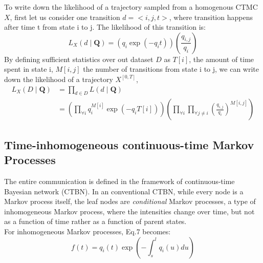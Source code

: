 \documentclass[]{article}
\begin{document}
To write down the likelihood of a trajectory sampled from a homogenous CTMC $ X $, first let us consider one transition $ d = <i,j,t> $, where transition happens after time t from state i to j. The likelihood of this transition is:
\begin{equation}
L_{X}(d \mid \textbf{Q})=\left(q_{i} \exp \left(-q_{i} t\right)\right)\left(\frac{q_{i,j}}{q_{i}}\right)
\end{equation}
By defining sufficient statistics over out dataset $ D $ as $ T[i] $, the amount of time spent in state i, $ M[i,j] $ the number of transitions from state i to j, we can write down the likelihood of a trajectory $  X^{\left[0,T\right] } $,
\begin{equation}
\begin{split}
L_{X}(D \mid \textbf{Q}) &=  \prod_{d \in D} L(d \mid \textbf{Q}) \\&=\left(\prod_{\forall i} q_{i}^{M[i]} \exp \left(-q_{i} T[i]\right)\right)\left(\prod_{\forall i} \prod_{\forall j \neq i} \left(\frac{q_{i,j}}{q_{i}}\right)^{M\left[i, j\right]}\right)
\end{split}
\end{equation}

\subsection{Time-inhomogeneous continuous-time Markov Processes}
The entire communication is defined in the framework of continuous-time Bayesian network (CTBN). In an conventional CTBN, while every node is a Markov process itself, the leaf nodes are \textit{conditional} Markov processes, a type of inhomogeneous Markov process, where the intensities change over time, but not as a function of time rather as a function of parent states. \cite{Nodelman1995} \\

For inhomogeneous Markov processes, Eq.7 becomes:
\begin{equation}
f(t) = q_{i}(t) \exp \left(-\int_{s}^{l} q_{i}(u) d u\right)
\end{equation}
\end{document}
